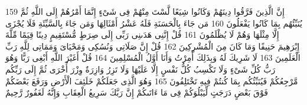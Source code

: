 \documentclass[20pt,a4paper]{article}
\begin{document}
{\tiny\colorbox{cl_aya}{159}} إِنَّ الَّذِينَ فَرَّقُوا دِينَهُمْ وَكَانُوا شِيَعًا لَّسْتَ مِنْهُمْ فِى شَىْءٍ إِنَّمَا أَمْرُهُمْ إِلَى اللَّهِ ثُمَّ يُنَبِّئُهُم بِمَا كَانُوا يَفْعَلُونَ
{\tiny\colorbox{cl_aya}{160}} مَن جَاءَ بِالْحَسَنَةِ فَلَهُ عَشْرُ أَمْثَالِهَا وَمَن جَاءَ بِالسَّيِّئَةِ فَلَا يُجْزَى إِلَّا مِثْلَهَا وَهُمْ لَا يُظْلَمُونَ
{\tiny\colorbox{cl_aya}{161}} قُلْ إِنَّنِى هَدَىنِى رَبِّى إِلَى صِرَطٍ مُّسْتَقِيمٍ دِينًا قِيَمًا مِّلَّةَ إِبْرَهِيمَ حَنِيفًا وَمَا كَانَ مِنَ الْمُشْرِكِينَ
{\tiny\colorbox{cl_aya}{162}} قُلْ إِنَّ صَلَاتِى وَنُسُكِى وَمَحْيَاىَ وَمَمَاتِى لِلَّهِ رَبِّ الْعَلَمِينَ
{\tiny\colorbox{cl_aya}{163}} لَا شَرِيكَ لَهُ وَبِذَلِكَ أُمِرْتُ وَأَنَا أَوَّلُ الْمُسْلِمِينَ
{\tiny\colorbox{cl_aya}{164}} قُلْ أَغَيْرَ اللَّهِ أَبْغِى رَبًّا وَهُوَ رَبُّ كُلِّ شَىْءٍ وَلَا تَكْسِبُ كُلُّ نَفْسٍ إِلَّا عَلَيْهَا وَلَا تَزِرُ وَازِرَةٌ وِزْرَ أُخْرَى ثُمَّ إِلَى رَبِّكُم مَّرْجِعُكُمْ فَيُنَبِّئُكُم بِمَا كُنتُمْ فِيهِ تَخْتَلِفُونَ
{\tiny\colorbox{cl_aya}{165}} وَهُوَ الَّذِى جَعَلَكُمْ خَلَئِفَ الْأَرْضِ وَرَفَعَ بَعْضَكُمْ فَوْقَ بَعْضٍ دَرَجَتٍ لِّيَبْلُوَكُمْ فِى مَا ءَاتَىكُمْ إِنَّ رَبَّكَ سَرِيعُ الْعِقَابِ وَإِنَّهُ لَغَفُورٌ رَّحِيمٌ
\end{document}
